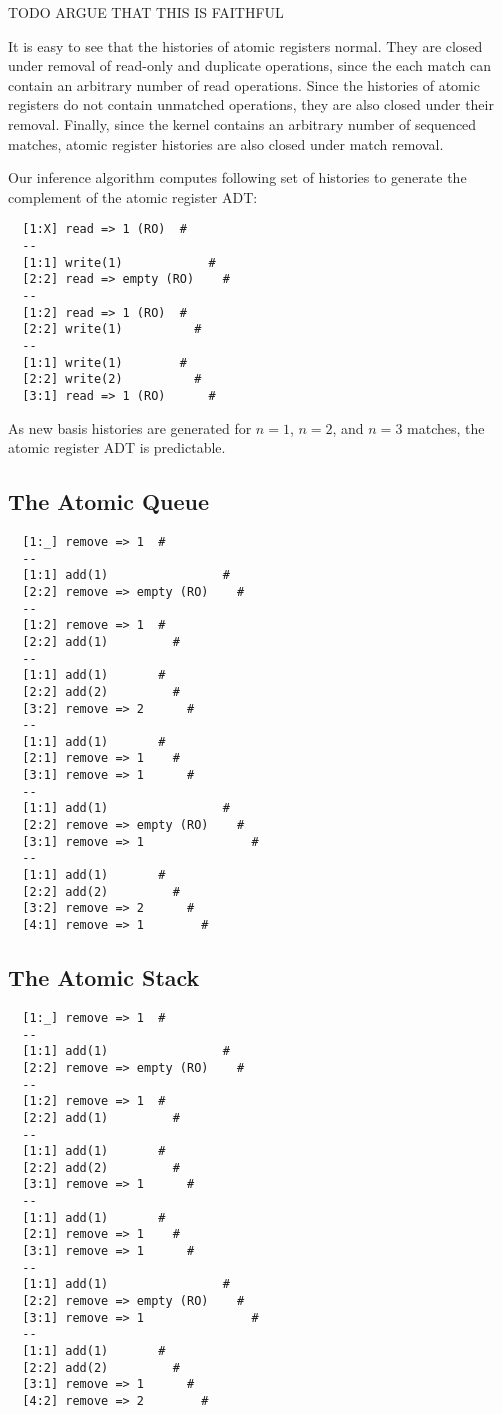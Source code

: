 TODO ARGUE THAT THIS IS FAITHFUL

It is easy to see that the histories of atomic registers normal. They are
closed under removal of read-only and duplicate operations, since the each
match can contain an arbitrary number of read operations. Since the histories
of atomic registers do not contain unmatched operations, they are also closed
under their removal. Finally, since the kernel contains an arbitrary number of
sequenced matches, atomic register histories are also closed under match
removal.

Our inference algorithm computes following set of histories to generate the
complement of the atomic register ADT:
\begin{verbatim}
  [1:X] read => 1 (RO)  #
  --
  [1:1] write(1)            #
  [2:2] read => empty (RO)    #
  --
  [1:2] read => 1 (RO)  #
  [2:2] write(1)          #
  --
  [1:1] write(1)        #
  [2:2] write(2)          #
  [3:1] read => 1 (RO)      #
\end{verbatim}
As new basis histories are generated for $n=1$, $n=2$, and $n=3$ matches, the
atomic register ADT is predictable.

\subsection{The Atomic Queue}

\begin{verbatim}
  [1:_] remove => 1  #
  --
  [1:1] add(1)                #
  [2:2] remove => empty (RO)    #
  --
  [1:2] remove => 1  #
  [2:2] add(1)         #
  --
  [1:1] add(1)       #
  [2:2] add(2)         #
  [3:2] remove => 2      #
  --
  [1:1] add(1)       #
  [2:1] remove => 1    #
  [3:1] remove => 1      #
  --
  [1:1] add(1)                #
  [2:2] remove => empty (RO)    #
  [3:1] remove => 1               #
  --
  [1:1] add(1)       #
  [2:2] add(2)         #
  [3:2] remove => 2      #
  [4:1] remove => 1        #
\end{verbatim}

\subsection{The Atomic Stack}

\begin{verbatim}
  [1:_] remove => 1  #
  --
  [1:1] add(1)                #
  [2:2] remove => empty (RO)    #
  --
  [1:2] remove => 1  #
  [2:2] add(1)         #
  --
  [1:1] add(1)       #
  [2:2] add(2)         #
  [3:1] remove => 1      #
  --
  [1:1] add(1)       #
  [2:1] remove => 1    #
  [3:1] remove => 1      #
  --
  [1:1] add(1)                #
  [2:2] remove => empty (RO)    #
  [3:1] remove => 1               #
  --
  [1:1] add(1)       #
  [2:2] add(2)         #
  [3:1] remove => 1      #
  [4:2] remove => 2        #
\end{verbatim}

